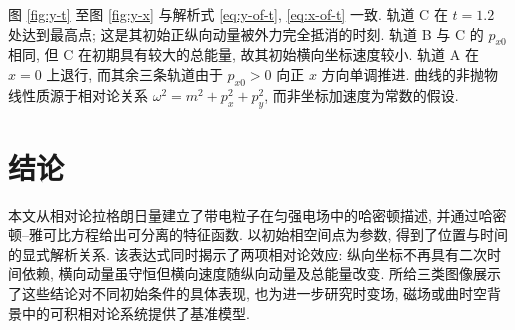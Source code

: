 \documentclass[UTF8, a4paper, 11pt]{ctexart}
\begin{document}
图 \ref{fig:y-t} 至图 \ref{fig:y-x} 与解析式 \eqref{eq:y-of-t}, \eqref{eq:x-of-t} 一致. 轨道 C 在 $t=1.2$ 处达到最高点; 这是其初始正纵向动量被外力完全抵消的时刻. 轨道 B 与 C 的 $p_{x0}$ 相同, 但 C 在初期具有较大的总能量, 故其初始横向坐标速度较小. 轨道 A 在 $x=0$ 上退行, 而其余三条轨道由于 $p_{x0}>0$ 向正 $x$ 方向单调推进. 曲线的非抛物线性质源于相对论关系 $\omega^2=m^2+p_x^2+p_y^2$, 而非坐标加速度为常数的假设.

\section{结论}

本文从相对论拉格朗日量建立了带电粒子在匀强电场中的哈密顿描述, 并通过哈密顿--雅可比方程给出可分离的特征函数. 以初始相空间点为参数, 得到了位置与时间的显式解析关系. 该表达式同时揭示了两项相对论效应: 纵向坐标不再具有二次时间依赖, 横向动量虽守恒但横向速度随纵向动量及总能量改变. 所给三类图像展示了这些结论对不同初始条件的具体表现, 也为进一步研究时变场, 磁场或曲时空背景中的可积相对论系统提供了基准模型.
\end{document}

